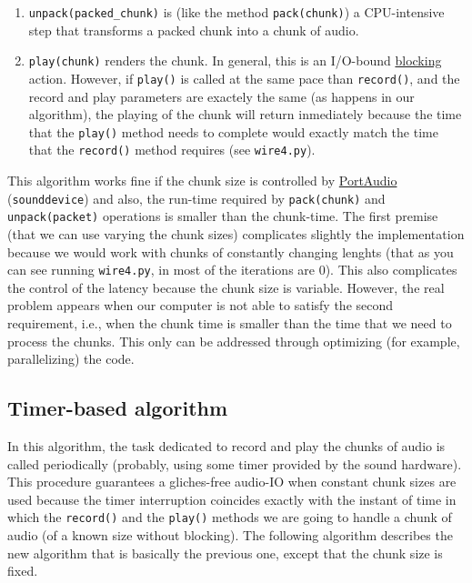 \begin{enumerate}
\item \verb|unpack(packed_chunk)| is (like the method
  \texttt{pack(chunk)}) a CPU-intensive step that transforms a
  packed chunk into a chunk of audio.

\item \verb|play(chunk)| renders the chunk. In general, this is an
  I/O-bound
  \href{https://python-sounddevice.readthedocs.io/en/0.4.0/api/streams.html#sounddevice.Stream.write}{blocking}
  action. However, if \verb|play()| is called at the same pace
  than \verb|record()|, and the record and play parameters are
  exactely the same (as happens in our algorithm), the playing of the
  chunk will return inmediately because the time that the
  \verb|play()| method needs to complete would exactly match the
  time that the \verb|record()| method requires (see
  \verb|wire4.py|).
\end{enumerate}

This algorithm works fine if the chunk size is controlled by
\href{http://www.portaudio.com/}{PortAudio}~\cite{portaudio}
(\verb|sounddevice|) and also, the run-time required by
\verb|pack(chunk)| and \verb|unpack(packet)| operations is smaller
than the chunk-time. The first premise (that we can use varying the
chunk sizes) complicates slightly the implementation because we would
work with chunks of constantly changing lenghts (that as you can see
running \verb|wire4.py|, in most of the iterations are 0). This also
complicates the control of the latency because the chunk size is
variable. However, the real problem appears when our computer is not
able to satisfy the second requirement, i.e., when the chunk time is
smaller than the time that we need to process the chunks. This only
can be addressed through optimizing (for example, parallelizing) the
code.

\subsection{Timer-based algorithm}

In this algorithm, the task dedicated to record and play the chunks of
audio is called periodically (probably, using some timer provided by
the sound hardware). This procedure guarantees a gliches-free audio-IO
when constant chunk sizes are used because the timer interruption
coincides exactly with the instant of time in which the
\verb|record()| and the \verb|play()| methods we are going to
handle a chunk of audio (of a known size without blocking). The
following algorithm describes the new algorithm that is basically the
previous one, except that the chunk size is fixed.

